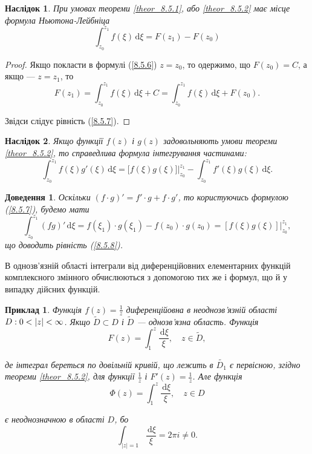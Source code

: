 \documentclass[12pt,fleqn]{article}
\newtheorem{exm}{Приклад}[section]
\theoremstyle{theorem}
\theoremstyle{proof}
\newtheorem*{dov}{Доведення}
\newtheorem{corollary}{Наслідок}[section]
\numberwithin{figure}{section}
\numberwithin{equation}{section}
\begin{document}
\begin{corollary}\label{corollary_8.5.2}
При умовах теореми \ref{theor_8.5.1}, або \ref{theor_8.5.2} має місце формула Ньютона-Лейбніца
\begin{equation}\label{8.5.7}
\int_{z_0}^{z_1}f(\xi)\,\mathrm{d}\xi = F(z_1) - F(z_0)
\end{equation}
\end{corollary}
\begin{proof}
Якщо покласти в формулі (\ref{8.5.6}) $z=z_0$, то одержимо, що $F(z_0)=C$, а якщо --- $z=z_1$, то
\[F(z_1)=\int_{z_0}^{z_1}f(\xi)\,\mathrm{d}\xi + C = \int_{z_0}^{z_1}f(\xi)\,\mathrm{d}\xi + F(z_0). \]

Звідси слідує рівність (\ref{8.5.7}).
\end{proof}

\begin{corollary}\label{corollary_8.5.3}
Якщо функції $f(z)$ і $g(z)$ задовольняють умови теореми \ref{theor_8.5.2}, то справедлива формула інтегрування частинами:
\begin{equation}\label{8.5.8}
\int_{z_0}^{z_1} f(\xi)g'(\xi)\,\mathrm{d}\xi = \bigg[f(\xi)g(\xi)\bigg] \bigg|_{z_0}^{z_1}-\int_{z_0}^{z_1}f'(\xi)g(\xi)\,\mathrm{d}\xi.
\end{equation}
\end{corollary}
\begin{dov}
Оскільки $(f\cdot g)'=f'\cdot g + f \cdot g'$, то користуючись формулою (\ref{8.5.7}), будемо мати
\[ \int_{z_0}^{z_1}(fg)'\,\mathrm{d}\xi=f(\xi_1)\cdot g(\xi_1)-f(z_0)\cdot g(z_0) = [f(\xi)g(\xi)]\bigg|_{z_0}^{z_1}, \]
що доводить рівність (\ref{8.5.8}).
\end{dov}

В однозв'язній області інтеграли від диференційовних елементарних функцій комплексного змінного обчислюються з допомогою тих же і формул, що й у випадку дійсних функцій.

\begin{exm}\label{exm_8.5.1}
Функція $f(z)=\frac{1}{z}$ диференційовна в неоднозв'язній області $\\ D:0<|z|<\infty$. Якщо $ \widetilde{D}\subset D$ і $\widetilde{D}$ --- однозв'язна область. Функція
\[ F(z) = \int_{1}^{z} \frac{\,\mathrm{d}\xi}{\xi}, \quad z \in \widetilde{D}, \]

де інтеграл береться по довільній кривій, що лежить в $\widetilde{D_1}$ є первісною, згідно теореми \ref{theor_8.5.2}, для функції $\frac{1}{z}$ і $F'(z)=\frac{1}{z}$. Але функція
\[ \Phi (z)= \int_{1}^{z} \frac{\,\mathrm{d}\xi}{\xi}, \quad z \in D \]

є неоднозначною в області $D$, бо
\[ \int_{|z|=1} \frac{\,\mathrm{d}\xi}{\xi}=2\pi i \neq 0. \]
\end{exm}
\end{document}
